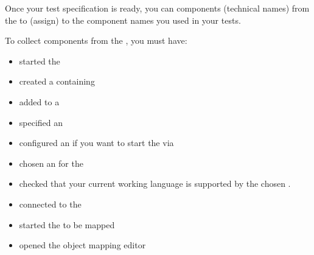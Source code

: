 
Once your test specification is ready, you can   components (technical names) from the \gdaut{} to  (assign) to the component names you used in your tests. 

To collect components from the \gdaut{}, you must have: 

\begin{itemize}
\item started the \gdserver{} 
\item created a \gdcase{} containing \gdsteps{} 
\item added \gdcases to a \gdsuite{} 
\item specified an \gdaut{}  
\item configured an \gdaut{}  if you want to start the \gdaut{} via \jb{}
\item chosen an \gdaut{} for the \gdsuite{} 
\item checked that your current working language is supported by the chosen \gdaut{}. 
\item connected to the \gdserver{} 
\item started the \gdaut{} to be mapped 
\item opened the object mapping editor 
\end{itemize}



